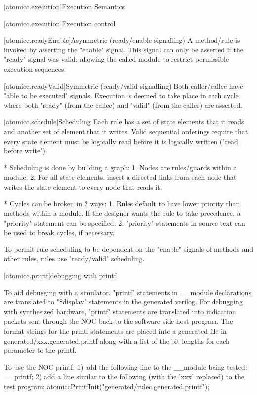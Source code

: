 [atomicc.execution]{Execution Semantics}

[atomicc.execution]{Execution control}

[atomicc.readyEnable]{Asymmetric (ready/enable signalling)}
A method/rule is invoked by asserting the "enable" signal.  This signal can only be
asserted if the "ready" signal was valid, allowing the called module to restrict
permissible execution sequences.

[atomicc.readyValid]{Symmetric (ready/valid signalling)}
Both caller/callee have "able to be executed" signals.  Execution is deemed to take
place in each cycle where both "ready" (from the callee) and "valid" (from the caller)
are asserted.

[atomicc.schedule]{Scheduling}
Each rule has a set of state elements that it reads and another set of element that it writes.
Valid sequential orderings require that every state element must be logically read before it is logically
written ("read before write").

* Scheduling is done by building a graph:
1. Nodes are rules/guards within a module.
2. For all state elements, insert a directed links from each node that writes the state element to every node that reads it.

* Cycles can be broken in 2 ways:
1. Rules default to have lower priority than methods within a module.  If the designer wants the rule to take precedence, a "priority" statement can be specified.
2. "priority" statements in source text can be used to break cycles, if necessary.

To permit rule scheduling to be dependent on the "enable" signals of methods and other rules, rules use "ready/valid" scheduling.

[atomicc.printf]{debugging with printf}

To aid debugging with a simulator, "printf" statements in __module declarations are
translated to "\$display" statements in the generated verilog.
For debugging with synthesized hardware, "printf" statements are translated into
indication packets sent through the NOC back to the software side host program.
The format strings for the printf statements are placed into a generated file
in generated/xxx.generated.printf along with a list of the bit lengths for each
parameter to the printf.

To use the NOC printf:
   1) add the following line to the __module being tested:
           __printf;
   2) add a line similar to the following (with the 'xxx' replaced) to the test program:
           atomiccPrintfInit("generated/rulec.generated.printf");

